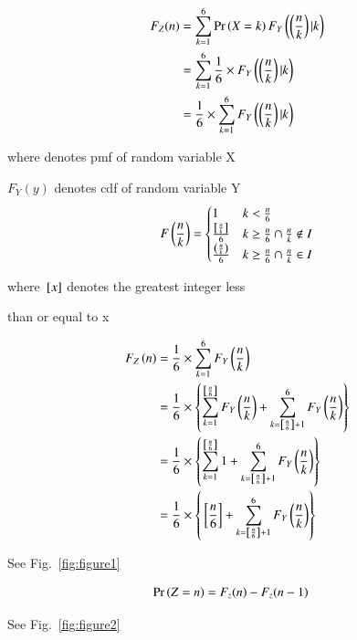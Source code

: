 \documentclass[journal,12pt,twocolumn]{IEEEtran}
\begin{document}
\begin{align}
F_Z(n) &= \sum_{k=1}^{6} \Pr\left(X=k\right) F_Y\left(\left(\frac{n}{k}\right)|k\right)\\
&=\sum_{k=1}^{6} \frac{1}{6} \times F_Y\left(\left(\frac{n}{k}\right)|k\right)\\
&=\frac{1}{6}\times\sum_{k=1}^{6} F_Y\left(\left(\frac{n}{k}\right)|k\right)
\end{align}

where  denotes pmf of random variable X

$F_Y(y)$ denotes cdf of random variable Y
\begin{align}
F\left(\frac{n}{k}\right)=
	\begin{cases}
		1 & k < \frac{n}{6}\\
		\frac{{}\left[\frac{n}{k}\right]}{6} & k \geq \frac{n}{6} \cap \frac{n}{k} \notin I\\
		\frac{\left(\frac{n}{k}\right)}{6} & k \geq \frac{n}{6} \cap \frac{n}{k} \in I
	\end{cases}
\end{align}

where ${}\left[x\right]$ denotes the greatest integer less 

than or equal to x

\begin{align}
F_Z\left(n\right) &= \frac{1}{6} \times \sum_{k=1}^{6} F_Y\left(\frac{n}{k}\right)\\
&=\frac{1}{6} \times \left\{\sum_{k=1}^{{}\left[\frac{n}{6} \right]} F_Y\left(\frac{n}{k}\right)+\sum_{k={}\left[\frac{n}{6}\right] + 1}^{6} F_Y\left(\frac{n}{k}\right)\right\}\\
&=\frac{1}{6} \times \left\{\sum_{k=1}^{{}\left[\frac{n}{6} \right]} 1+\sum_{k={}\left[ \frac{n}{6} \right] + 1}^{6} F_Y\left(\frac{n}{k}\right)\right\}\\
&=\frac{1}{6} \times \left\{{}\left[\frac{n}{6} \right] +\sum_{k={}\left[\frac{n}{6} \right] + 1}^{6} F_Y\left(\frac{n}{k}\right)\right\}\\
\end{align}

See Fig.~\ref{fig:figure1}

\begin{align}
\Pr\left(Z=n\right)&= F_z(n)-F_z(n-1)
\end{align}

See Fig.~\ref{fig:figure2}
\end{document}

